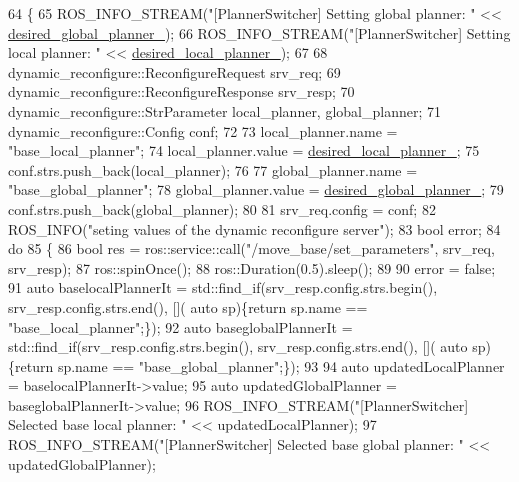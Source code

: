 \begin{DoxyCode}
64 \{
65   ROS\_INFO\_STREAM(\textcolor{stringliteral}{"[PlannerSwitcher] Setting global planner: "} << 
      \hyperlink{classcl__move__base__z_1_1PlannerSwitcher_aef047d3778b2993c1df146bbad43e03d}{desired\_global\_planner\_});
66   ROS\_INFO\_STREAM(\textcolor{stringliteral}{"[PlannerSwitcher] Setting local planner: "} << 
      \hyperlink{classcl__move__base__z_1_1PlannerSwitcher_a6cbf65f11bb69125f913caaabdf7b4cf}{desired\_local\_planner\_});
67 
68   dynamic\_reconfigure::ReconfigureRequest srv\_req;
69   dynamic\_reconfigure::ReconfigureResponse srv\_resp;
70   dynamic\_reconfigure::StrParameter local\_planner, global\_planner;
71   dynamic\_reconfigure::Config conf;
72 
73   local\_planner.name = \textcolor{stringliteral}{"base\_local\_planner"};
74   local\_planner.value = \hyperlink{classcl__move__base__z_1_1PlannerSwitcher_a6cbf65f11bb69125f913caaabdf7b4cf}{desired\_local\_planner\_};
75   conf.strs.push\_back(local\_planner);
76 
77   global\_planner.name = \textcolor{stringliteral}{"base\_global\_planner"};
78   global\_planner.value = \hyperlink{classcl__move__base__z_1_1PlannerSwitcher_aef047d3778b2993c1df146bbad43e03d}{desired\_global\_planner\_};
79   conf.strs.push\_back(global\_planner);
80 
81   srv\_req.config = conf;
82   ROS\_INFO(\textcolor{stringliteral}{"seting values of the dynamic reconfigure server"});
83   \textcolor{keywordtype}{bool} error;
84   \textcolor{keywordflow}{do}
85   \{
86     \textcolor{keywordtype}{bool} res = ros::service::call(\textcolor{stringliteral}{"/move\_base/set\_parameters"}, srv\_req, srv\_resp);
87     ros::spinOnce();
88     ros::Duration(0.5).sleep();
89     
90     error = \textcolor{keyword}{false};
91     \textcolor{keyword}{auto} baselocalPlannerIt = std::find\_if(srv\_resp.config.strs.begin(), srv\_resp.config.strs.end(), [](\textcolor{keyword}{
      auto} sp)\{\textcolor{keywordflow}{return} sp.name == \textcolor{stringliteral}{"base\_local\_planner"};\});
92     \textcolor{keyword}{auto} baseglobalPlannerIt = std::find\_if(srv\_resp.config.strs.begin(), srv\_resp.config.strs.end(), [](\textcolor{keyword}{
      auto} sp)\{\textcolor{keywordflow}{return} sp.name == \textcolor{stringliteral}{"base\_global\_planner"};\});
93 
94     \textcolor{keyword}{auto} updatedLocalPlanner = baselocalPlannerIt->value;
95     \textcolor{keyword}{auto} updatedGlobalPlanner = baseglobalPlannerIt->value;
96     ROS\_INFO\_STREAM(\textcolor{stringliteral}{"[PlannerSwitcher] Selected base local planner: "} << updatedLocalPlanner);
97     ROS\_INFO\_STREAM(\textcolor{stringliteral}{"[PlannerSwitcher] Selected base global planner: "} << updatedGlobalPlanner);

\end{DoxyCode}
